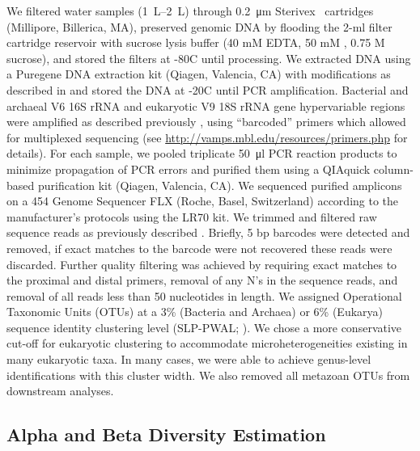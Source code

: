 We filtered water samples (\SIrange{1}{2}{\L}) through \SI{0.2}{\micro\m} Sterivex\texttrademark~ cartridges (Millipore, Billerica, MA), preserved genomic DNA by flooding the 2-ml filter cartridge reservoir with sucrose lysis buffer (40 mM EDTA, 50 mM , 0.75 M sucrose), and stored the filters at -80\textdegree C until processing. We extracted DNA using a Puregene DNA extraction kit (Qiagen, Valencia, CA) with modifications as described in \citet{amdh09} and stored the DNA at -20\textdegree C until PCR amplification. Bacterial and archaeal V6 16S rRNA and eukaryotic V9 18S rRNA gene hypervariable regions were amplified as described previously \citep{hwmhnbs07, amdh09}, using ``barcoded'' primers which allowed for multiplexed sequencing (see \url{http://vamps.mbl.edu/resources/primers.php} for details). For each sample, we pooled triplicate \SI{50}{\micro\l} PCR reaction products to minimize propagation of PCR errors and purified them using a QIAquick column-based purification kit (Qiagen, Valencia, CA). We sequenced purified amplicons on a 454 Genome Sequencer FLX (Roche, Basel, Switzerland) according to the manufacturer's protocols using the LR70 kit. We trimmed and filtered raw sequence reads as previously described \citep{hhmsw07}. Briefly, 5 bp barcodes were detected and removed, if exact matches to the barcode were not recovered these reads were discarded. Further quality filtering was achieved by requiring exact matches to the proximal and distal primers, removal of any N's in the sequence reads, and removal of all reads less than 50 nucleotides in length. We assigned Operational Taxonomic Units (OTUs) at a 3\% (Bacteria and Archaea) or 6\% (Eukarya) sequence identity clustering level (SLP-PWAL; \citet{hwms10}). We chose a more conservative cut-off for eukaryotic clustering to accommodate microheterogeneities existing in many eukaryotic taxa. In many cases, we were able to achieve genus-level identifications with this cluster width. We also removed all metazoan OTUs from downstream analyses.

\subsection{Alpha and Beta Diversity Estimation}\label{ssc:alpha-and-beta-diversity-estimation}

